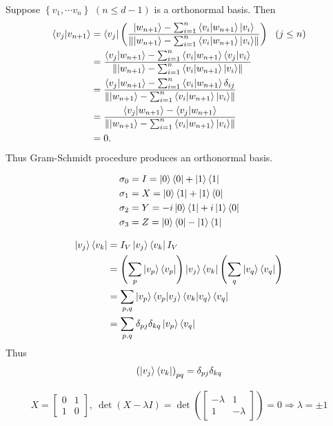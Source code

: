 Suppose $\left\{v_1, \cdots v_n \right\}$ $(n \leq d-1)$ is a orthonormal basis. Then
\begin{align*}
	\braket{v_j | v_{n+1}} &= \bra{v_j} \left(\frac{\ket{w_{n+1}} - \sum_{i=1}^{n}\braket{v_i | w_{n+1}}\ket{v_i}}{\left\lVert\ket{w_{n+1}} - \sum_{i=1}^{n}\braket{v_i | w_{n+1}}\ket{v_i}\right\rVert}\right)~~(j \leq n)\\
	&= \frac{\braket{v_j | w_{n+1}} - \sum_{i=1}^{n}\braket{v_i | w_{n+1}}\braket{v_j | v_i}}{\left\lVert\ket{w_{n+1}} - \sum_{i=1}^{n}\braket{v_i | w_{n+1}}\ket{v_i}\right\rVert}\\
	&= \frac{\braket{v_j | w_{n+1}} - \sum_{i=1}^{n}\braket{v_i | w_{n+1}}\delta_{ij}}{\left\lVert\ket{w_{n+1}} - \sum_{i=1}^{n}\braket{v_i | w_{n+1}}\ket{v_i}\right\rVert}\\
	&= \frac{\braket{v_j | w_{n+1}} - \braket{v_j | w_{n+1}}}{\left\lVert\ket{w_{n+1}} - \sum_{i=1}^{n}\braket{v_i | w_{n+1}}\ket{v_i}\right\rVert}\\
	&= 0.
\end{align*}
Thus Gram-Schmidt procedure produces an orthonormal basis.


\begin{align*}
	\sigma_0 &= I = \ket{0}\bra{0} + \ket{1}\bra{1}\\
	\sigma_1 &= X = \ket{0}\bra{1} + \ket{1}\bra{0}\\
	\sigma_2 &= Y = -i\ket{0}\bra{1} + i\ket{1}\bra{0}\\
	\sigma_3 &= Z = \ket{0}\bra{0} - \ket{1}\bra{1}
\end{align*}


\begin{align*}
	\ket{v_j}\bra{v_k} &= I_V \ket{v_j} \bra{v_k} I_V\\
	&= \left(\sum_p \ket{v_p}\bra{v_p} \right) \ket{v_j}\bra{v_k} \left(\sum_q \ket{v_q}\bra{v_q} \right)\\
	&= \sum_{p,q} \ket{v_p} \braket{v_p|v_j}
	\braket{v_k | v_q} \bra{v_q}\\
	&= \sum_{p,q} \delta_{pj} \delta_{kq} \ket{v_p} \bra{v_q}
\end{align*}
Thus
\begin{align*}
	\left( \ket{v_j}\bra{v_k} \right)_{pq} = \delta_{pj} \delta_{kq}
\end{align*}



\begin{align*}
	X = \begin{bmatrix}
	0 & 1 \\
	1 & 0
	\end{bmatrix},\ \det(X-\lambda I) =
	\det \left(\begin{bmatrix}
	-\lambda & 1 \\
	1 & -\lambda
	\end{bmatrix} \right) = 0 \Rightarrow \lambda = \pm 1
\end{align*}

